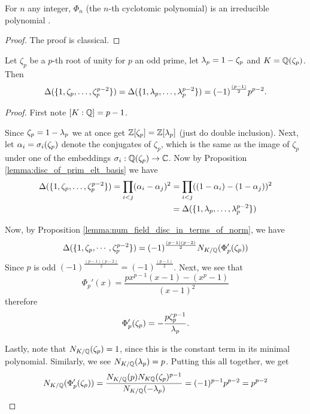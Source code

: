 \begin{lemma}\label{lemma:cyclo_poly_irr}
	\leanok
	For $n$ any integer, $\Phi_n$ (the $n$-th cyclotomic polynomial) is an irreducible polynomial .
\end{lemma}
\begin{proof}
	\leanok
	The proof is classical.
\end{proof}

\begin{lemma}\label{lem:discr_of_cyclo}
	\leanok
	Let $\zeta_p$ be a $p$-th root of unity for $p$ an odd prime, let $\lambda_p=1-\zeta_p$ and $K=\mathbb{Q}(\zeta_p)$. Then \[\Delta(\{1,\zeta_p,\dots,\zeta_p^{p-2}\})=\Delta(\{1,\lambda_p,\dots,\lambda_p^{p-2}\})=(-1)^{\frac{(p-1)}{2}}p^{p-2}.\]
\end{lemma}
\begin{proof}
	\leanok
	First note $[K:\mathbb{Q}]=p-1$.

	Since $\zeta_p=1-\lambda_p$ we at once get $\mathbb{Z}[\zeta_p]=\mathbb{Z}[\lambda_p]$ (just do double inclusion). Next, let $\alpha_i=\sigma_i(\zeta_p)$ denote the conjugates of $\zeta_p$, which is the same as the image of $\zeta_p$ under one of the embeddings $\sigma_i: \mathbb{Q}(\zeta_p) \to \mathbb{C}$. Now  by Proposition \ref{lemma:disc_of_prim_elt_basis} we have \begin{align*}\Delta(\{1,\zeta_p,\dots,\zeta_p^{p-2}\})=\prod_{i < j}  (\alpha_i-\alpha_j)^2 &=\prod_{i < j}  ((1-\alpha_i)-(1-\alpha_j))^2\\&=\Delta(\{1,\lambda_p,\dots,\lambda_p^{p-2}\})\end{align*}

	Now, by Proposition \ref{lemma:num_field_disc_in_terms_of_norm}, we have \[\Delta(\{1,\zeta_p,\cdots,\zeta_p^{p-2}\})=(-1)^{\frac{(p-1)(p-2)}{2}}N_{K/\mathbb{Q}}(\Phi_p'(\zeta_p)  )\]
	Since $p$ is odd $(-1)^{\frac{(p-1)(p-2)}{2}}=(-1)^{\frac{(p-1)}{2}}$. Next, we see that \[\Phi_p'(x)=\frac{px^{p-1}(x-1)-(x^p-1)}{(x-1)^2}\] therefore \[\Phi_p'(\zeta_p)=-\frac{p\zeta_p^{p-1}}{\lambda_p}.\]

	Lastly, note that $N_{K/\mathbb{Q}}(\zeta_p)=1$, since this is the constant term in its minimal polynomial. Similarly, we see $N_{K/\mathbb{Q}}(\lambda_p)=p$. Putting this all together, we get \[N_{K/\mathbb{Q}}(\Phi_p'(\zeta_p)  )=\frac{N_{K/\mathbb{Q}}(p)N_{K\mathbb{Q}}(\zeta_p)^{p-1}}{N_{K/\mathbb{Q}}(-\lambda_p)}=(-1)^{p-1}p^{p-2}=p^{p-2}\]
\end{proof}

